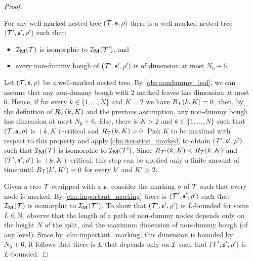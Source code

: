 \begin{proof}
\begin{claim} \label{clm:important_marking}
  For any well-marked nested tree $(\t, \spt, \marking)$
  there is a well-marked nested tree $(\t', \spt', \marking')$ such that:
  \begin{itemize}
      \item $\someInterp_{\marked}(\t)$ is isomorphic to $\someInterp_{\marked}(\t')$, and
    \item every non-dummy bough of $(\t', \spt', \marking')$ is of dimension at most $N_0 +6$.
  \end{itemize} 
\end{claim}
\begin{claimproof}
  Let $(\t, \spt, \marking)$ be a well-marked nested tree.
  By \cref{obs:nondummy_leaf}, we can assume that any non-dummy bough with  $2$ marked leaves has dimension at most $6$. 
  Hence, if for every $k \in \{1,\dots, N\}$ and $K=2$ we have $R_{\t}(k,K)=0$, then, by the definition of $R_{\t}(k,K)$ and the previous assumption, any non-dummy bough has dimension at most $N_0+6$.
  Else, there is $K>2$ and $k\in\{1,\dots ,N\}$ such that  $(\t, \spt, \marking)$ is $(k,K)$-critical and $R_{\t}(k,K)>0$. 
  Pick $K$ to be maximal with respect to this property and apply \cref{clm:iteration_marked} to obtain $(\t', \spt', \marking')$ such that $\someInterp_{\marked}(\t)$ is isomorphic to $\someInterp_{\marked}(\t')$.
  Since $R_{\t'}(k,K) < R_{\t}(k,K)$ and $(\t', \spt', \marking')$ is $(k,K)$-critical, this step can be applied only a finite amount of time until $R_{\t}(k',K')=0$ for every $k'$ and $K'>2$.
\end{claimproof}

Given a tree  $\t$  equipped with a  $\mathfrak{s}$, consider the marking $\rho$ of $\t$ such that every node is marked. 
By \cref{clm:important_marking} there is $(\t', \spt', \marking')$ such that  $\someInterp_{\marked}(\t)$ is isomorphic to $\someInterp_{\marked}(\t')$.
To show that $(\t', \spt', \marking')$ is $L$-bounded for some $L\in \mathbb{N}$, observe that  the length of a path of non-dummy nodes depends only on the height $N$ of the split, and the maximum dimension of non-dummy bough (of any level). 
Since by \cref{clm:important_marking} this dimension is bounded by $N_0+6$, it follows that there is $L$ that depends only on $\mathcal{I}$ such that $(\t', \spt', \marking')$ is $L$-bounded.

\end{proof}
